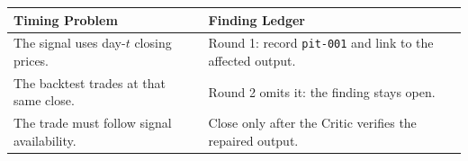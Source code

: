 \begin{tabular}{@{}P{6.0cm}P{6.5cm}@{}}
\toprule
\textbf{Timing Problem} & \textbf{Finding Ledger} \\
\midrule
The signal uses day-$t$ closing prices. &
Round 1: record \texttt{pit-001} and link to the affected output. \\
The backtest trades at that same close. &
Round 2 omits it: the finding stays open. \\
The trade must follow signal availability. &
Close only after the Critic verifies the repaired output. \\
\bottomrule
\end{tabular}
